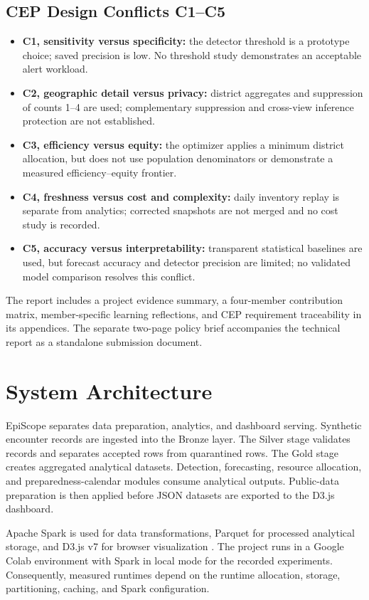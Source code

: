 \documentclass[conference]{IEEEtran}
\begin{document}
\subsection{CEP Design Conflicts C1--C5}
\begin{itemize}
\item \textbf{C1, sensitivity versus specificity:} the detector threshold is a prototype choice; saved precision is low. No threshold study demonstrates an acceptable alert workload.
\item \textbf{C2, geographic detail versus privacy:} district aggregates and suppression of counts 1--4 are used; complementary suppression and cross-view inference protection are not established.
\item \textbf{C3, efficiency versus equity:} the optimizer applies a minimum district allocation, but does not use population denominators or demonstrate a measured efficiency--equity frontier.
\item \textbf{C4, freshness versus cost and complexity:} daily inventory replay is separate from analytics; corrected snapshots are not merged and no cost study is recorded.
\item \textbf{C5, accuracy versus interpretability:} transparent statistical baselines are used, but forecast accuracy and detector precision are limited; no validated model comparison resolves this conflict.
\end{itemize}
The report includes a project evidence summary, a four-member contribution matrix, member-specific learning reflections, and CEP requirement traceability in its appendices. The separate two-page policy brief accompanies the technical report as a standalone submission document.

\section{System Architecture}

EpiScope separates data preparation, analytics, and dashboard serving. Synthetic encounter records are ingested into the Bronze layer. The Silver stage validates records and separates accepted rows from quarantined rows. The Gold stage creates aggregated analytical datasets. Detection, forecasting, resource allocation, and preparedness-calendar modules consume analytical outputs. Public-data preparation is then applied before JSON datasets are exported to the D3.js dashboard.

Apache Spark is used for data transformations, Parquet for processed analytical storage, and D3.js v7 for browser visualization \cite{spark,parquet,d3}. The project runs in a Google Colab environment with Spark in local mode for the recorded experiments. Consequently, measured runtimes depend on the runtime allocation, storage, partitioning, caching, and Spark configuration.
\end{document}
